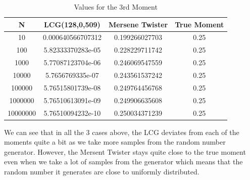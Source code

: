 \documentclass[a4paper,11pt]{article}
\begin{document}
\begin{table}[ht]
\centering
\label{1moment}
\begin{tabular}{|c|c|c|c|}
\hline
\textbf{N} & \textbf{LCG(128,0,509)}&\textbf{Mersene Twister}&\textbf{True Moment} \\ \hline
10 & 0.000640566707312 & 0.199266027703 & 0.25 \\
100 & 5.82333370283e-05 & 0.228229711742 & 0.25 \\
1000 & 5.77087123704e-06 & 0.246069547559 & 0.25 \\
10000 & 5.7656769335e-07 & 0.243561537242 & 0.25 \\
100000 & 5.76515801739e-08 & 0.249764456768 & 0.25 \\
1000000 & 5.76510613091e-09 & 0.249906635608 & 0.25 \\
10000000 & 5.76510094232e-10 & 0.250034371239 & 0.25 \\
\hline
\end{tabular}
\caption{Values for the 3rd Moment}
\end{table}
We can see that in all the 3 cases above, the LCG deviates from each of the moments quite a bit as we take more samples from the random number generator. However, the Mersent Twister stays quite close to the true moment even when we take a lot of samples from the generator which means that the random number it generates are close to uniformly distributed.
% 
\end{document}

